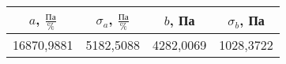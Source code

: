 \begin{tabular}[t]{|c|c|c|c|}
\hline
$a$, $\frac{Па}{\%}$ & $\sigma_a$, $\frac{Па}{\%}$ & $b$, Па & $\sigma_b$, Па \\ 
\hline
16870,9881 & 5182,5088 & 4282,0069 & 1028,3722 \\ 
\hline
\end{tabular}